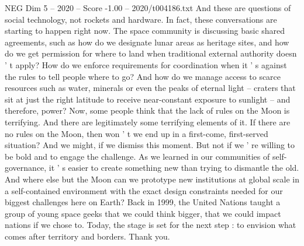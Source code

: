 \begin{textsample}{NEG Dim 5 – 2020 – Score -1.00 – 2020/t004186.txt}
And these are questions of social technology, not rockets and hardware.
In fact, these conversations are starting to happen right now.
The space community is discussing basic shared agreements, such as how do we designate lunar areas as heritage sites, and how do we get permission for where to land when traditional external authority doesn ' t apply?
How do we enforce requirements for coordination when it ' s against the rules to tell people where to go?
And how do we manage access to scarce resources such as water, minerals or even the peaks of eternal light -- craters that sit at just the right latitude to receive near-constant exposure to sunlight -- and therefore, power?
Now, some people think that the lack of rules on the Moon is terrifying.
And there are legitimately some terrifying elements of it.
If there are no rules on the Moon, then won ' t we end up in a first-come, first-served situation?
And we might, if we dismiss this moment.
But not if we ' re willing to be bold and to engage the challenge.
As we learned in our communities of self-governance, it ' s easier to create something new than trying to dismantle the old.
And where else but the Moon can we prototype new institutions at global scale in a self-contained environment with the exact design constraints needed for our biggest challenges here on Earth?
Back in 1999, the United Nations taught a group of young space geeks that we could think bigger, that we could impact nations if we chose to.
Today, the stage is set for the next step : to envision what comes after territory and borders.
Thank you.

\end{textsample}
